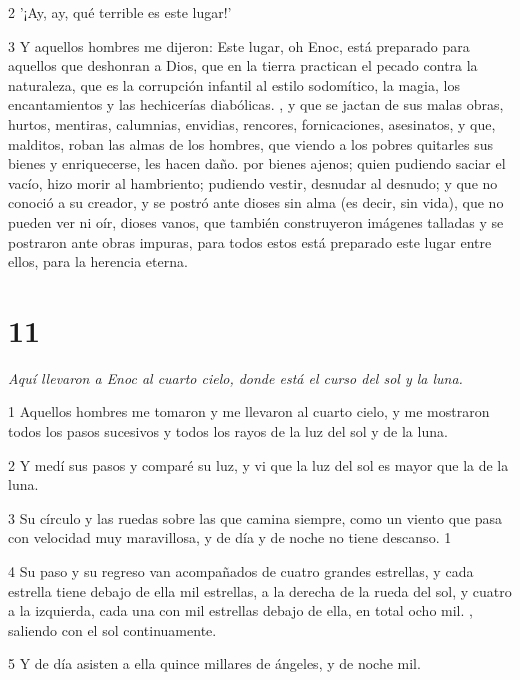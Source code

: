 \par 2 '¡Ay, ay, qué terrible es este lugar!'

\par 3 Y aquellos hombres me dijeron: Este lugar, oh Enoc, está preparado para aquellos que deshonran a Dios, que en la tierra practican el pecado contra la naturaleza, que es la corrupción infantil al estilo sodomítico, la magia, los encantamientos y las hechicerías diabólicas. , y que se jactan de sus malas obras, hurtos, mentiras, calumnias, envidias, rencores, fornicaciones, asesinatos, y que, malditos, roban las almas de los hombres, que viendo a los pobres quitarles sus bienes y enriquecerse, les hacen daño. por bienes ajenos; quien pudiendo saciar el vacío, hizo morir al hambriento; pudiendo vestir, desnudar al desnudo; y que no conoció a su creador, y se postró ante dioses sin alma (es decir, sin vida), que no pueden ver ni oír, dioses vanos, que también construyeron imágenes talladas y se postraron ante obras impuras, para todos estos está preparado este lugar entre ellos, para la herencia eterna.

\chapter{11}

\par \textit{Aquí llevaron a Enoc al cuarto cielo, donde está el curso del sol y la luna.}

\par 1 Aquellos hombres me tomaron y me llevaron al cuarto cielo, y me mostraron todos los pasos sucesivos y todos los rayos de la luz del sol y de la luna.

\par 2 Y medí sus pasos y comparé su luz, y vi que la luz del sol es mayor que la de la luna.

\par 3 Su círculo y las ruedas sobre las que camina siempre, como un viento que pasa con velocidad muy maravillosa, y de día y de noche no tiene descanso. 1

\par 4 Su paso y su regreso van acompañados de cuatro grandes estrellas, y cada estrella tiene debajo de ella mil estrellas, a la derecha de la rueda del sol, y cuatro a la izquierda, cada una con mil estrellas debajo de ella, en total ocho mil. , saliendo con el sol continuamente.

\par 5 Y de día asisten a ella quince millares de ángeles, y de noche mil.

